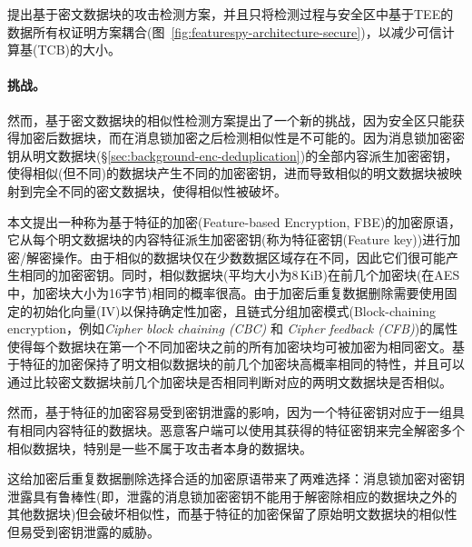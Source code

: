 \sysnameF 提出基于密文数据块的攻击检测方案，并且只将检测过程与安全区中基于TEE的数据所有权证明方案耦合(图~\ref{fig:featurespy-architecture-secure})，以减少可信计算基(TCB)的大小。

\paragraph*{挑战。}
然而，基于密文数据块的相似性检测方案提出了一个新的挑战，因为安全区只能获得加密后数据块，而在消息锁加密之后检测相似性是不可能的。因为消息锁加密密钥从明文数据块(\S\ref{sec:background-enc-deduplication})的全部内容派生加密密钥，使得相似(但不同)的数据块产生不同的加密密钥，进而导致相似的明文数据块被映射到完全不同的密文数据块，使得相似性被破坏。

本文提出一种称为基于特征的加密(Feature-based Encryption, FBE)的加密原语，它从每个明文数据块的内容特征派生加密密钥(称为特征密钥(Feature key))进行加密/解密操作。由于相似的数据块仅在少数数据区域存在不同，因此它们很可能产生相同的加密密钥。同时，相似数据块(平均大小为8\,KiB)在前几个加密块(在AES中，加密块大小为16字节)相同的概率很高。由于加密后重复数据删除需要使用固定的初始化向量(IV)以保持确定性加密，且链式分组加密模式(Block-chaining encryption，例如\textit{Cipher block chaining (CBC)} 和 \textit{Cipher feedback (CFB)})的属性使得每个数据块在第一个不同加密块之前的所有加密块均可被加密为相同密文。基于特征的加密保持了明文相似数据块的前几个加密块高概率相同的特性，并且可以通过比较密文数据块前几个加密块是否相同判断对应的两明文数据块是否相似。

然而，基于特征的加密容易受到密钥泄露的影响，因为一个特征密钥对应于一组具有相同内容特征的数据块。恶意客户端可以使用其获得的特征密钥来完全解密多个相似数据块，特别是一些不属于攻击者本身的数据块。

这给加密后重复数据删除选择合适的加密原语带来了两难选择：消息锁加密对密钥泄露具有鲁棒性(即，泄露的消息锁加密密钥不能用于解密除相应的数据块之外的其他数据块)但会破坏相似性，而基于特征的加密保留了原始明文数据块的相似性但易受到密钥泄露的威胁。
